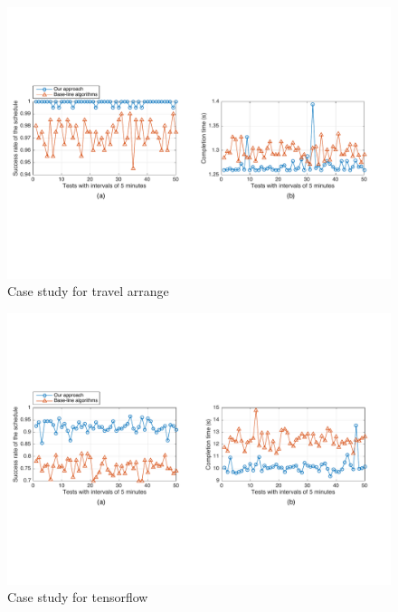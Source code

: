 \documentclass[journal]{IEEEtran}
\begin{document}
\begin{figure}[!t]
\centering
\includegraphics[width=6.6in]{./img/Task-6.pdf}
\caption{Case study for travel arrange}
\label{Task-6}
\end{figure}


\begin{figure}[!t]
\centering
\includegraphics[width=6.6in]{./img/Task-12.pdf}
\caption{Case study for tensorflow}
\label{Task-12}
\end{figure}
\end{document}
